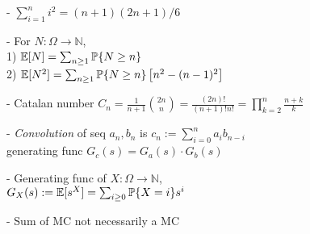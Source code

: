 \documentclass[10pt]{article}
\DeclarePairedDelimiter{\set}{\lbrace}{\rbrace}
\newcommand{\E}{\mathbb{E}}
\newcommand{\N}{\mathbb{N}}
\renewcommand{\P}{\mathbb{P}}
\begin{document}
\begin{multicols}{3}
- $\sum_{i=1}^n i^2 = (n+1)(2n+1)/6$

- For $N:\Omega\to \N$, \\
1) $\E[N] = \sum_{n\geq 1} \P\set{N\geq n}$ \\
2) $\E[N^2] = \sum_{n\geq 1} \P\set{N\geq n} \left[ n^2 - (n-1)^2 \right]$

- Catalan number
$C_n = \frac1{n+1}\binom{2n}{n} = \frac{(2n)!}{(n+1)! n!} = \prod_{k=2}^n \frac{n+k}k$

- \emph{Convolution} of seq $a_n, b_n$ is
$c_n := \sum_{i=0}^n a_i b_{n-i}$ \\
generating func $G_c(s) = G_a(s)\cdot G_b(s)$

- Generating func of $X:\Omega\to \N$, \\
$G_X(s) := \E[s^X] =\sum_{i\geq 0} \P\set{X=i} s^i$

- Sum of MC not necessarily a MC
\end{multicols}
\end{document}
